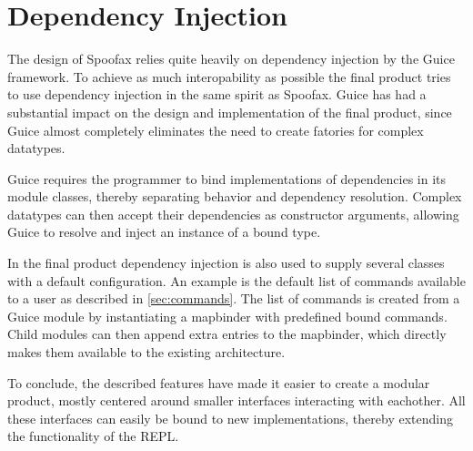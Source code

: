 \section{Dependency Injection}
\label{sec:injection}

The design of Spoofax relies quite heavily on dependency injection by the Guice
framework.  To achieve as much interopability as possible the final product
tries to use dependency injection in the same spirit as Spoofax. Guice has had
a substantial impact on the design and implementation of the final product,
since Guice almost completely eliminates the need to create fatories for
complex datatypes.

Guice requires the programmer to bind implementations of dependencies in its
module classes, thereby separating behavior and dependency resolution.  Complex
datatypes can then accept their dependencies as constructor arguments, allowing
Guice to resolve and inject an instance of a bound type.

In the final product dependency injection is also used to supply several
classes with a default configuration.  An example is the default list of
commands available to a user as described in \cref{sec:commands}.  The list of
commands is created from a Guice module by instantiating a mapbinder with
predefined bound commands. Child modules can then append extra entries to the
mapbinder, which directly makes them available to the existing architecture.

To conclude, the described features have made it easier to create a modular
product, mostly centered around smaller interfaces interacting with eachother.
All these interfaces can easily be bound to new implementations, thereby
extending the functionality of the REPL.

